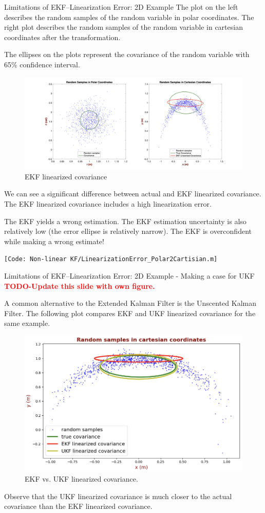 \begin{frame}{Limitations of EKF--Linearization Error: 2D Example}
The plot on the left describes the random samples of the random variable in polar
coordinates. The right plot describes the random samples of the random variable in
cartesian coordinates after the transformation.

The ellipses on the plots represent the covariance of the random variable with 65\% confidence interval.
\begin{figure}
    \centering
    \includegraphics[width=0.7\linewidth]{Figures//Part3/LinearizationError_2D_Demo.png}
    \vspace{-10pt}
    \caption{EKF linearized covariance}
\end{figure}

We can see a significant difference between actual and EKF linearized covariance.
The EKF linearized covariance includes a high linearization error.
\vspace{5pt}

The EKF yields a wrong estimation. The EKF estimation uncertainty is also relatively
low (the error ellipse is relatively narrow). The EKF is overconfident while making a wrong
estimate!

\texttt{\tiny [Code: Non-linear KF/LinearizationError\_Polar2Cartisian.m]}
\end{frame}
\begin{frame}{Limitations of EKF--Linearization Error: 2D Example - Making a case for UKF}
\textbf{\textcolor{red}{TODO-Update this slide with own figure.}}

A common alternative to the Extended Kalman Filter is the Unscented Kalman
Filter. The following plot compares EKF and UKF linearized covariance for the same example.

\begin{figure}
    \centering
    \includegraphics[width=0.5\linewidth]{Figures//Part3/EKF_vs_UKF_LinearizationError.png}
    \caption{EKF vs. UKF linearized covariance.}
\end{figure}

Observe that the UKF linearized covariance is much closer to the actual covariance
than the EKF linearized covariance.
\end{frame}



